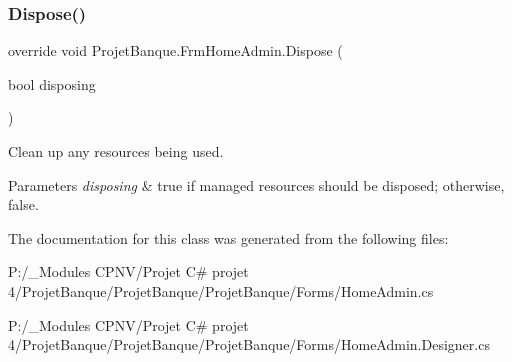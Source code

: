 \subsubsection{\texorpdfstring{Dispose()}{Dispose()}}
{\footnotesize\ttfamily override void Projet\+Banque.\+Frm\+Home\+Admin.\+Dispose (\begin{DoxyParamCaption}\item[{bool}]{disposing }\end{DoxyParamCaption})\hspace{0.3cm}{\ttfamily [protected]}}



Clean up any resources being used. 


\begin{DoxyParams}{Parameters}
{\em disposing} & true if managed resources should be disposed; otherwise, false.\\
\hline
\end{DoxyParams}


The documentation for this class was generated from the following files\+:\begin{DoxyCompactItemize}
\item 
P\+:/\+\_\+\+Modules C\+P\+N\+V/\+Projet C\# projet 4/\+Projet\+Banque/\+Projet\+Banque/\+Projet\+Banque/\+Forms/Home\+Admin.\+cs\item 
P\+:/\+\_\+\+Modules C\+P\+N\+V/\+Projet C\# projet 4/\+Projet\+Banque/\+Projet\+Banque/\+Projet\+Banque/\+Forms/Home\+Admin.\+Designer.\+cs\end{DoxyCompactItemize}
